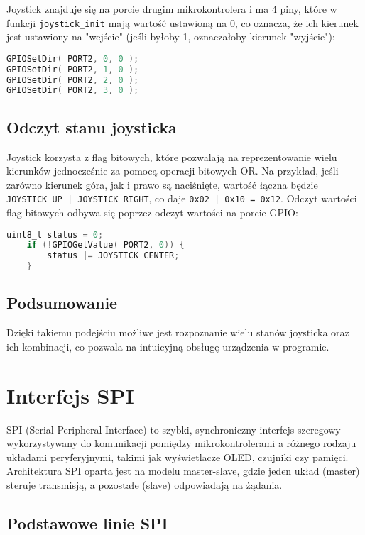 \documentclass[a4paper,12pt]{report}
\begin{document}
Joystick znajduje się na porcie drugim mikrokontrolera i ma 4 piny, które w funkcji \texttt{joystick\_init} mają wartość ustawioną na 0, co oznacza, że ich kierunek jest ustawiony na "wejście" (jeśli byłoby 1, oznaczałoby kierunek "wyjście"):
\begin{lstlisting}[language=C]
GPIOSetDir( PORT2, 0, 0 );
GPIOSetDir( PORT2, 1, 0 );
GPIOSetDir( PORT2, 2, 0 );
GPIOSetDir( PORT2, 3, 0 );
\end{lstlisting}

\subsection{Odczyt stanu joysticka}

Joystick korzysta z flag bitowych, które pozwalają na reprezentowanie wielu kierunków jednocześnie za pomocą operacji bitowych OR. Na przykład, jeśli zarówno kierunek góra, jak i prawo są naciśnięte, wartość łączna będzie \texttt{JOYSTICK\_UP | JOYSTICK\_RIGHT}, co daje \texttt{0x02 | 0x10 = 0x12}.
Odczyt wartości flag bitowych odbywa się poprzez odczyt wartości na porcie GPIO:
\begin{lstlisting}[language=C]
    uint8_t status = 0;
    if (!GPIOGetValue( PORT2, 0)) {
        status |= JOYSTICK_CENTER;
    }

\end{lstlisting}
\subsection*{Podsumowanie}

Dzięki takiemu podejściu możliwe jest rozpoznanie wielu stanów joysticka oraz ich kombinacji, co pozwala na intuicyjną obsługę urządzenia w programie.

\section{Interfejs SPI}

SPI (Serial Peripheral Interface) to szybki, synchroniczny interfejs szeregowy wykorzystywany do komunikacji pomiędzy mikrokontrolerami a różnego rodzaju układami peryferyjnymi, takimi jak wyświetlacze OLED, czujniki czy pamięci. Architektura SPI oparta jest na modelu master-slave, gdzie jeden układ (master) steruje transmisją, a pozostałe (slave) odpowiadają na żądania.

\subsection{Podstawowe linie SPI}
\end{document}
